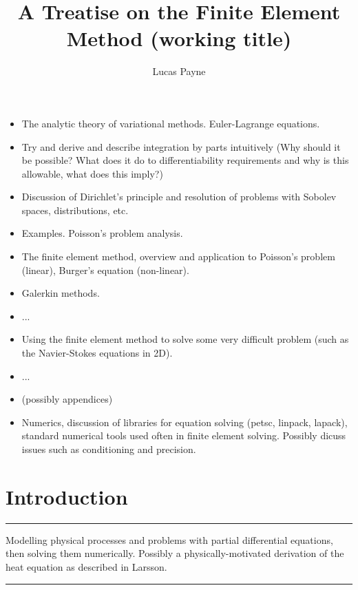 \documentclass[11pt,a4paper]{memoir}
\title{A Treatise on the Finite Element Method
\scriptsize{(working title)}
}
\author{Lucas Payne}
\newcommand{\todo}[1]{\vskip 0.1in \hrule \vskip 0.03in {#1} \vskip 0.03in \hrule \vskip 0.1in}
\begin{document}
\maketitle

% 
% 


\begin{itemize}
\item The analytic theory of variational methods.
      Euler-Lagrange equations.
\item Try and derive and describe integration by parts intuitively (Why should it be possible? What does it do to differentiability
requirements and why is this allowable, what does this imply?)
\item Discussion of Dirichlet's principle and resolution of problems with Sobolev spaces, distributions, etc.
\item Examples. Poisson's problem analysis.

\item The finite element method, overview and application to Poisson's problem (linear), Burger's equation (non-linear).
\item Galerkin methods.

\item ...
\item Using the finite element method to solve some very difficult problem (such as the Navier-Stokes equations in 2D).
\item ...
\item (possibly appendices)
\item Numerics, discussion of libraries for equation solving (petsc, linpack, lapack),
standard numerical tools used often in finite element solving. Possibly dicuss issues
such as conditioning and precision.


\end{itemize}
\newpage


\tableofcontents
\newpage

\section{Introduction}
\todo{
Modelling physical processes and problems with partial differential equations, then solving them numerically.
Possibly a physically-motivated derivation of the heat equation as described in Larsson.

}
\end{document}
